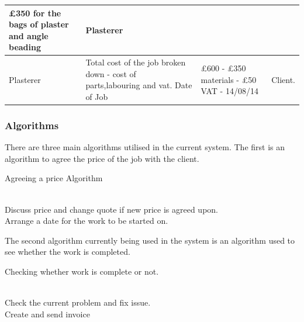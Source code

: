 \begin{center}
\begin{tabular}{|p{3cm}|p{3cm}|p{3cm}|p{3cm}|}
\pounds 350 for the bags of plaster and angle beading &

Plasterer


\\
\hline

Plasterer &

Total cost of the job broken down - cost of parts,labouring and vat. Date of Job &

\pounds 600 - \pounds 350 materials - \pounds 50 VAT - 14/08/14 &

Client.

\\
        \hline
    \end{tabular}
\end{center}

\pagebreak
\subsubsection{Algorithms}

There are three main algorithms utilised in the current system. The first is an algorithm to agree the price of the job with the client.

\begin{algorithm}[H]
\label{fig:algorithm_example_1}
	\caption{Agreeing a price Algorithm}
\begin{algorithmic}[1]

	
					\\ Discuss price and change quote if new price is agreed upon.\;
		\Else 
			  \\ Arrange a date for the work to be started on.\;
		\EndIf
	\EndWhile

\end{algorithmic}
\end{algorithm}


The second algorithm currently being used in the system is an algorithm used to see whether the work is completed.


\begin{algorithm}[H]
	\label{fig:algorithm_work_complete}
		\caption{Checking whether work is complete or not.}
	\begin{algorithmic}[1]
			 \\ Check the current problem and fix issue.
			\Else
			\EndIf
		\EndWhile
		\\Create and send invoice
	\end{algorithmic}
\end{algorithm}

